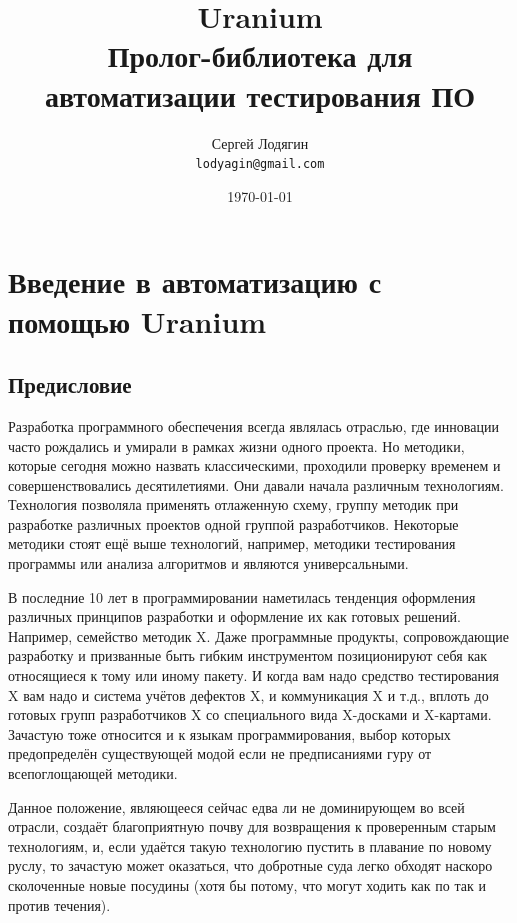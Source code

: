 \documentclass[a4paper]{book}
\def\td{т.\thinspace д.}
\def\ur{Uranium}
\begin{document}
\title{{\bf\ur}\\ \medskip  Пролог-библиотека для автоматизации
  тестирования ПО}
\author{Сергей Лодягин\\ \texttt{lodyagin@gmail.com}}
\date{\today}
\maketitle

\tableofcontents

\part{Введение в автоматизацию с помощью \ur}

\chapter{Предисловие}

Разработка программного обеспечения всегда являлась отраслью, где
инновации часто рождались и умирали в рамках жизни одного
проекта. Но методики, которые сегодня можно назвать
классическими, проходили проверку временем и совершенствовались
десятилетиями. Они давали начала различным
технологиям. Технология позволяла применять отлаженную схему,
группу методик при разработке различных проектов одной группой
разработчиков. Некоторые методики стоят ещё выше технологий,
например, методики тестирования программы или анализа алгоритмов
и являются универсальными.

В последние 10 лет в программировании наметилась тенденция
оформления различных принципов разработки и оформление их как
готовых решений. Например, семейство методик X. Даже программные
продукты, сопровождающие разработку и призванные быть гибким
инструментом позиционируют себя как относящиеся к тому или иному
пакету. И когда вам надо средство тестирования X вам надо и
система учётов дефектов X, и коммуникация X и \td, вплоть до
готовых групп разработчиков X со специального вида X-досками и
X-картами.  Зачастую тоже относится и к языкам программирования,
выбор которых предопределён существующей модой если не
предписаниями гуру от всепоглощающей методики.

Данное положение, являющееся сейчас едва ли не доминирующем во
всей отрасли, создаёт благоприятную почву для возвращения к
проверенным старым технологиям, и, если удаётся такую технологию
пустить в плавание по новому руслу, то зачастую может оказаться,
что добротные суда легко обходят наскоро сколоченные новые
посудины (хотя бы потому, что могут ходить как по так и против
течения).
\end{document}
